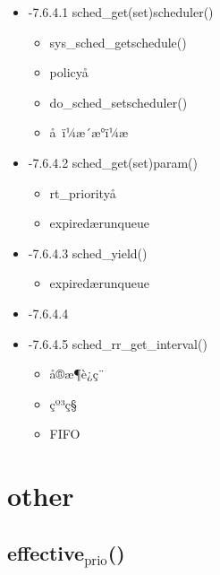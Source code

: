 \documentclass[11pt]{article}
\begin{document}
\begin{itemize}

\item -7.6.4.1 sched\_get(set)scheduler()\\
\label{sec-2.6.4.1}

\begin{itemize}
\item sys\_sched\_getschedule()
\item policyå
\item do\_sched\_setscheduler()
\item å ï¼æ´æ°ï¼æ
\end{itemize}

\item -7.6.4.2 sched\_get(set)param()\\
\label{sec-2.6.4.2}

\begin{itemize}
\item rt\_priorityå
\item expiredærunqueue
\end{itemize}

\item -7.6.4.3 sched\_yield()\\
\label{sec-2.6.4.3}

\begin{itemize}
\item expiredærunqueue
\end{itemize}

\item -7.6.4.4\\
\label{sec-2.6.4.4}



\item -7.6.4.5 sched\_rr\_get\_interval()\\
\label{sec-2.6.4.5}

\begin{itemize}
\item å®æ¶è¿ç¨
\item çº³ç§
\item FIFO
\end{itemize}
\end{itemize} %
\section{other}
\label{sec-3}

\subsection{effective$_{\mathrm{prio}}$()}
\label{sec-3.1}
\end{document}
